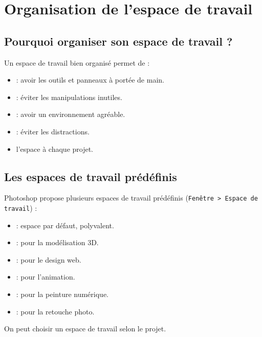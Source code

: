 \section{Organisation de l'espace de travail}

\subsection{Pourquoi organiser son espace de travail ?}

Un espace de travail bien organisé permet de :

\begin{itemize}
    \item {} : avoir les outils et panneaux à portée de main.
    \item {} : éviter les manipulations inutiles.
    \item {} : avoir un environnement agréable.
    \item {} : éviter les distractions.
    \item {} l'espace à chaque projet.
\end{itemize}

\subsection{Les espaces de travail prédéfinis}

Photoshop propose plusieurs espaces de travail prédéfinis (\texttt{Fenêtre > Espace de travail}) :

\begin{itemize}
    \item {} : espace par défaut, polyvalent.
    \item {} : pour la modélisation 3D.
    \item {} : pour le design web.
    \item {} : pour l'animation.
    \item {} : pour la peinture numérique.
    \item {} : pour la retouche photo.
\end{itemize}

On peut choisir un espace de travail selon le projet.

